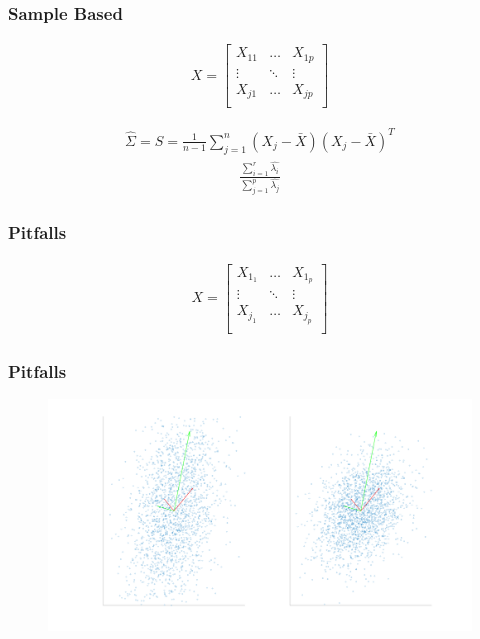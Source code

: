 \documentclass[aspectratio=169,10pt,t]{beamer}
\begin{document}
\begin{frame}[t]
    \frametitle{Sample Based}

    \begin{align*}
    X = \begin{bmatrix}
			X_{11} & \hdots & X_{1p} \\
        \vdots &  \ddots & \vdots  \\
				X_{j1} & \hdots & X_{jp} \\
    \end{bmatrix}
    \end{align*}

    \begin{align*}
        \hat{\Sigma} = S = \frac{1}{n-1} \sum^{n}_{j=1} (X_j - \bar{X} )(X_j - \bar{X} )^T
    \end{align*}
   \begin{align*}
    \frac{ \sum^{r}_{i=1} \hat{\lambda_i}  }{ \sum^{p}_{j=1} \hat{\lambda_j}  }
   \end{align*}
    

    
\end{frame}

\begin{frame}[t]
    \frametitle{Pitfalls}

    \begin{align*}
    X = \begin{bmatrix}
        X_1_1 & \hdots & X_1_p \\
        \vdots &  \ddots & \vdots  \\
        X_j_1 & \hdots & X_j_p \\
    \end{bmatrix}
    \end{align*}

    
\end{frame}

\begin{frame}[t]
    \frametitle{Pitfalls}

    \begin{figure}[H]
        \centering
        \includegraphics[width=0.8\linewidth]{images/compare.png}
    \end{figure}
    
\end{frame}
\end{document}
